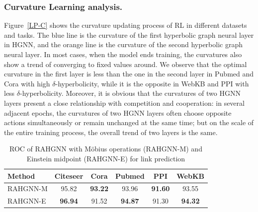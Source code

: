 \subsubsection{Curvature Learning analysis.}
Figure~\ref{LP-C} shows the curvature updating process of RL in different datasets and tasks. 
The blue line is the curvature of the first hyperbolic graph neural layer in HGNN, and the orange line is the curvature of the second hyperbolic graph neural layer. In most cases, when the model ends training, the curvatures also show a trend of converging to fixed values around.  We observe that the optimal curvature in the first layer is less than the one in the second layer in Pubmed and Cora with high $\delta$-hyperbolicity, while it is the opposite in WebKB and PPI with less $\delta$-hyperbolicity. 
Moreover, it is obvious that the curvatures of two HGNN layers present a close relationship with competition and cooperation: in several adjacent epochs, the curvatures of two HGNN layers often choose opposite actions simultaneously or remain unchanged at the same time; but on the scale of the entire training process, the overall trend of two layers is the same.


\begin{table}[htb]
\caption{ROC of RAHGNN with Möbius operations (RAHGNN-M) and Einstein midpoint (RAHGNN-E) for link prediction}
\begin{tabular}{lccccc}
\toprule
\textbf{Method} & \textbf{Citeseer} & \textbf{Cora} & \textbf{Pubmed} & \textbf{PPI} & \textbf{WebKB} \\ 
\midrule
RAHGNN-M         & 95.82          &  \textbf{93.22} & 93.96          & \textbf{91.60} & 93.55          \\
RAHGNN-E         & \textbf{96.94} &  91.52          & \textbf{94.87} & 91.30          & \textbf{94.32} \\ 
\bottomrule
\end{tabular}
\label{ablation}
\end{table}

